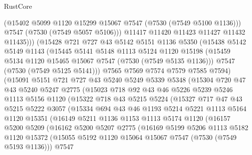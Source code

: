 \begin{lexlean}{RustCore}
\begin{coremodule}
              (@15402 @5099 @1120 @15299 @15067 @7547 (@7530 (@7549 @5100 @1136)))
              @7547
              (@7530 (@7549 @5057 @5106)))
            @11417
            @11420
            @11423
            @11427
            @11432
            @11435)))
      (@15428
        @721
        @727
        @43
        @5142
        @5151
        @1136
        @5350
        (@15438
          @5142
          @5149
          @1143
          (@15445
            @5141
            @5148
            @1113
            @5124
            @1120
            @15198
            (@15459 @5134 @1120 @15465 @15067 @7547 (@7530 (@7549 @5135 @1136)))
            @7547
            (@7530 (@7549 @5125 @5141)))
          @7565
          @7569
          @7574
          @7579
          @7585
          @7594)
        (@15091
          @5151
          @721
          @727
          @43
          @5240
          @5249
          @5339
          @5348
          (@15304
            @720
            @47
            @43
            @5240
            @5247
            @2775
            (@15023
              @718
              @92
              @43
              @46
              @5226
              @5239
              @5246
              @1113
              @5156
              @1120
              (@15322
                @718
                @43
                @5215
                @5224
                (@15327
                  @717
                  @47
                  @43
                  @5215
                  @5222
                  @3057
                  (@15334
                    @694
                    @43
                    @46
                    @1193
                    @5214
                    @5221
                    @1113
                    @5164
                    @1120
                    @15351
                    (@16149
                      @5211
                      @1136
                      @1153
                      @1113
                      @5174
                      @1120
                      (@16157
                        @5200
                        @5209
                        (@16162
                          @5200
                          @5207
                          @2775
                          (@16169
                            @5199
                            @5206
                            @1113
                            @5182
                            @1120
                            @15372
                            (@15055 @5192 @1120 @15064 @15067 @7547 (@7530 (@7549 @5193 @1136)))
                            @7547

\end{coremodule}
\end{lexlean}
